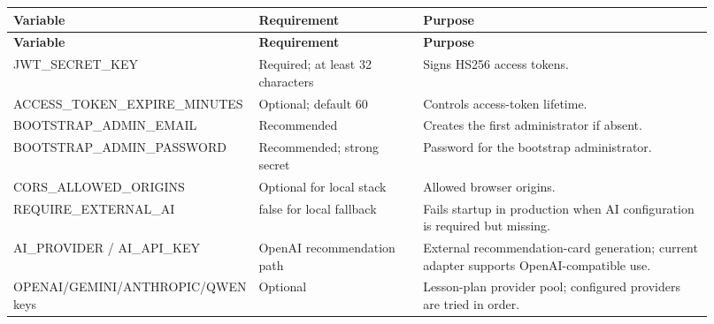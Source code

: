 \documentclass[11pt,a4paper]{article}
\begin{document}
\begin{small}

\setlength{\tabcolsep}{3pt}

\begin{longtable}{>{\raggedright\arraybackslash}p{0.241\linewidth}>{\raggedright\arraybackslash}p{0.241\linewidth}>{\raggedright\arraybackslash}p{0.438\linewidth}}

\hline

\textbf{Variable} & \textbf{Requirement} & \textbf{Purpose} \\ \hline

\endfirsthead

\hline

\textbf{Variable} & \textbf{Requirement} & \textbf{Purpose} \\ \hline

\endhead

JWT\_\allowbreak{}SECRET\_\allowbreak{}KEY & Required; at least 32 characters & Signs HS256 access tokens. \\ \hline

ACCESS\_\allowbreak{}TOKEN\_\allowbreak{}EXPIRE\_\allowbreak{}MINUTES & Optional; default 60 & Controls access-token lifetime. \\ \hline

BOOTSTRAP\_\allowbreak{}ADMIN\_\allowbreak{}EMAIL & Recommended & Creates the first administrator if absent. \\ \hline

BOOTSTRAP\_\allowbreak{}ADMIN\_\allowbreak{}PASSWORD & Recommended; strong secret & Password for the bootstrap administrator. \\ \hline

CORS\_\allowbreak{}ALLOWED\_\allowbreak{}ORIGINS & Optional for local stack & Allowed browser origins. \\ \hline

REQUIRE\_\allowbreak{}EXTERNAL\_\allowbreak{}AI & false for local fallback & Fails startup in production when AI configuration is required but missing. \\ \hline

AI\_\allowbreak{}PROVIDER /\allowbreak{} AI\_\allowbreak{}API\_\allowbreak{}KEY & OpenAI recommendation path & External recommendation-card generation; current adapter supports OpenAI-compatible use. \\ \hline

OPENAI/\allowbreak{}GEMINI/\allowbreak{}ANTHROPIC/\allowbreak{}QWEN keys & Optional & Lesson-plan provider pool; configured providers are tried in order. \\ \hline

\end{longtable}

\end{small}
\end{document}
